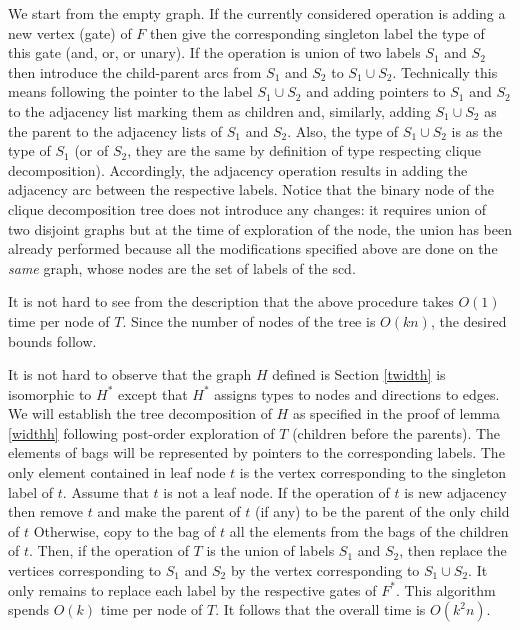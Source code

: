 \documentclass{llncs}
\begin{document}
We start from the empty graph. If the currently considered
operation is adding a new vertex (gate) of $F$ then 
give the corresponding singleton label the type of this gate ({\sc and}, {\sc or}, or unary). If the operation is union of two 
labels $S_1$ and $S_2$ then introduce the child-parent arcs from $S_1$ and $S_2$ to $S_1 \cup S_2$. 
Technically this means following the pointer to the label $S_1 \cup S_2$ and adding pointers to $S_1$ and $S_2$
to the adjacency list marking them as children and, similarly, adding $S_1 \cup S_2$ as the parent to the 
adjacency lists of $S_1$ and $S_2$. Also, the type of $S_1 \cup S_2$ is as the type of $S_1$ (or of $S_2$, they are the same by definition
of type respecting clique decomposition). Accordingly, the adjacency operation results in adding the adjacency arc between 
the respective labels. Notice that the binary node of the clique decomposition tree does not introduce any changes: it requires union
of two disjoint graphs but at the time of exploration of the node, the union has been already performed because all the modifications
specified above are done on the \emph{same} graph, whose nodes are the set of labels of the {\sc scd}.

It is not hard to see from the description that the above procedure takes $O(1)$ time per node of $T$.
Since the number of nodes of the tree is $O(kn)$, the desired bounds follow. 

It is not hard to observe that the graph $H$ defined is Section \ref{twidth} is isomorphic to $H^*$ except that $H^*$ assigns types to
nodes and directions to edges. We will establish the tree decomposition of $H$ as specified in the proof of lemma \ref{widthh} following
post-order exploration of $T$ (children before the parents). The elements of bags will be represented by pointers to the corresponding labels.
The only element contained in leaf node $t$ is the vertex corresponding to the singleton label of $t$. Assume that $t$ is not a leaf node.
If the operation of $t$ is new adjacency then remove $t$ and make the parent of $t$ (if any) to be the parent of the only child of $t$
Otherwise, copy to the bag of $t$ all the elements from the bags of the children of $t$. Then, if the operation of $T$ is the union of labels $S_1$
and $S_2$, then replace the vertices corresponding to $S_1$ and $S_2$ by the vertex corresponding to $S_1 \cup S_2$. 
It only remains to replace each label by the respective gates of $F^*$. This algorithm spends $O(k)$ time per node of $T$. It follows 
that the overall time is $O(k^2n)$. 
\end{document}

